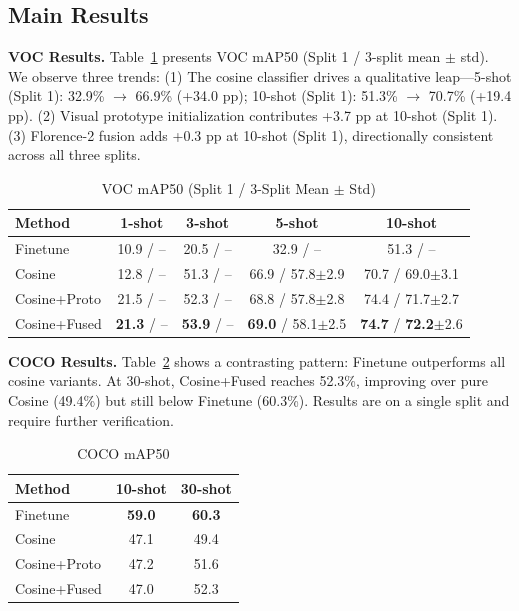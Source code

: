\documentclass[conference]{IEEEtran}
\begin{document}
\subsection{Main Results}

\textbf{VOC Results.} Table~\ref{tab:voc_main} presents VOC mAP50 (Split 1 / 3-split mean $\pm$ std). We observe three trends: (1) The cosine classifier drives a qualitative leap---5-shot (Split 1): 32.9\% $\rightarrow$ 66.9\% (+34.0 pp); 10-shot (Split 1): 51.3\% $\rightarrow$ 70.7\% (+19.4 pp). (2) Visual prototype initialization contributes +3.7 pp at 10-shot (Split 1). (3) Florence-2 fusion adds +0.3 pp at 10-shot (Split 1), directionally consistent across all three splits.

\begin{table}[t]
\centering\footnotesize
\caption{VOC mAP50 (Split 1 / 3-Split Mean $\pm$ Std)}
\label{tab:voc_main}
\begin{tabular}{lcccc}
\toprule
Method & 1-shot & 3-shot & 5-shot & 10-shot \\
\midrule
Finetune      & 10.9 / --   & 20.5 / --    & 32.9 / --    & 51.3 / --     \\
Cosine        & 12.8 / --   & 51.3 / --    & 66.9 / 57.8$\pm$2.9 & 70.7 / 69.0$\pm$3.1 \\
Cosine+Proto  & 21.5 / --   & 52.3 / --    & 68.8 / 57.8$\pm$2.8 & 74.4 / 71.7$\pm$2.7 \\
Cosine+Fused  & \textbf{21.3} / -- & \textbf{53.9} / -- & \textbf{69.0} / 58.1$\pm$2.5 & \textbf{74.7} / \textbf{72.2}$\pm$2.6 \\
\bottomrule
\end{tabular}
\end{table}

\textbf{COCO Results.} Table~\ref{tab:coco_main} shows a contrasting pattern: Finetune outperforms all cosine variants. At 30-shot, Cosine+Fused reaches 52.3\%, improving over pure Cosine (49.4\%) but still below Finetune (60.3\%). Results are on a single split and require further verification.

\begin{table}[ht]
\centering
\caption{COCO mAP50}
\label{tab:coco_main}
\begin{tabular}{lcc}
\toprule
Method & 10-shot & 30-shot \\
\midrule
Finetune      & \textbf{59.0} & \textbf{60.3} \\
Cosine        & 47.1 & 49.4 \\
Cosine+Proto  & 47.2 & 51.6 \\
Cosine+Fused  & 47.0 & 52.3 \\
\bottomrule
\end{tabular}
\end{table}
\end{document}
